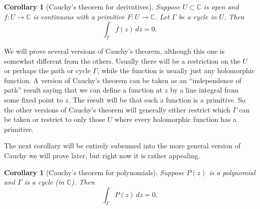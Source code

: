 \documentclass[12pt,openany]{book}
\newcommand{\C}{{\mathbb{C}}}
\newcommand{\myquote}[1]{``#1''}
\theoremstyle{plain}
\newtheorem{cor}[thm]{Corollary}
\theoremstyle{remark}
\theoremstyle{definition}
\theoremstyle{exercise}
\theoremstyle{example}
\begin{document}
\begin{cor}[Cauchy's theorem for derivatives] \label{cor:cauchyforders}
%
Suppose $U \subset \C$ is open and $f \colon U \to \C$
is continuous with a primitive
$F \colon U \to \C$.
Let $\Gamma$ be
a cycle
in $U$.
Then
\begin{equation*}
\int_\Gamma f(z) \, dz = 0 .
\end{equation*}
\end{cor}

We will prove several versions of Cauchy's theorem, although this one is
somewhat different from the others.  Usually there will be a restriction on
the $U$ or perhaps the path or cycle $\Gamma$,
while the function is usually just any holomorphic function.
A version of Cauchy's theorem can be taken as an \myquote{independence of path}
result saying that we can define a function at $z$ by a line integral
from some fixed point to $z$.  The result will be that such a function is a
primitive.  So the other versions of Cauchy's theorem will generally
either restrict which $\Gamma$ can be taken or
restrict to only those $U$ where every holomorphic function has a primitive.

The next corollary will be entirely
subsumed into the more general version of Cauchy we will prove later,
but right now it is rather appealing.

\begin{cor}[Cauchy's theorem for polynomials] \label{cor:cauchyforpoly}
%
Suppose $P(z)$ is a polynomial and $\Gamma$ is
a cycle (in $\C$).
Then
\begin{equation*}
\int_\Gamma P(z) \, dz = 0 .
\end{equation*}
\end{cor}
\end{document}

